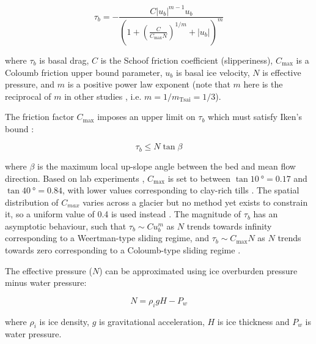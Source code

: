 \begin{equation}
  \tau_b = -\frac{C |u_b|^{m-1} u_b}{\left(1 + \left(\frac{C}{C_{\text{max}}N}\right)^{1/m} + |u_b|\right)^m} \label{eq:schoof}
\end{equation}

where $\tau_b$ is basal drag, $C$ is the Schoof friction coefficient (slipperiness), $C_{\text{max}}$ is a Coloumb friction upper bound parameter, $u_b$ is basal ice velocity, $N$ is effective pressure, and $m$ is a positive power law exponent (note that $m$ here is the reciprocal of $m$ in other studies \citep[e.g.][]{TsaiMarineicesheetprofiles2015}, i.e. $m = 1/m_{\text{Tsai}} = 1/3$).

The friction factor $C_{\text{max}}$ imposes an upper limit on $\tau_b$ which must satisfy Iken's bound \citep{IkenEffectSubglacialWater1981,GagliardiniFiniteelementmodelingsubglacial2007}:

\begin{equation}
  \tau_b \leq N\tan\beta
\end{equation}

where $\beta$ is the maximum local up-slope angle between the bed and mean flow direction.
Based on lab experiments \citep{IversonRingshearstudiestill1998}, $C_{\text{max}}$ is set to between $\tan \SI{10}{\degree} = 0.17$ and $\tan \SI{40}{\degree} = 0.84$, with lower values corresponding to clay-rich tills \citep[, pp.266-267]{Cuffeyphysicsglaciers2010}.
The spatial distribution of $C_{max}$ varies across a glacier but no method yet exists to constrain it, so a uniform value of 0.4 is used instead \citep[0.4 and 0.6 was used in][]{BrondexSensitivitycentennialmass2019}.
The magnitude of $\tau_b$ has an asymptotic behaviour, such that $\tau_b \sim C u_b^m$ as $N$ trends towards infinity corresponding to a Weertman-type sliding regime, and $\tau_b \sim C_{\text{max}} N$ as $N$ trends towards zero corresponding to a Coloumb-type sliding regime \citep{BrondexSensitivitygroundingline2017}.

The effective pressure ($N$) can be approximated using ice overburden pressure minus water pressure:

\begin{equation}
  N = \rho_i g H - P_w
\end{equation}

where $\rho_i$ is ice density, $g$ is gravitational acceleration, $H$ is ice thickness and $P_w$ is water pressure.

